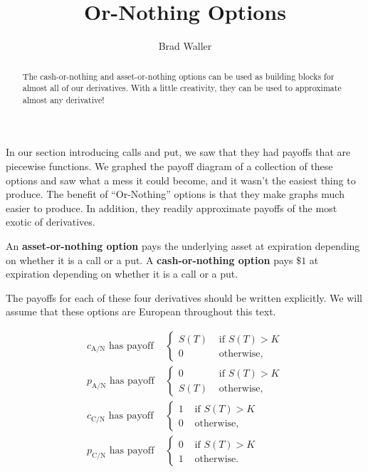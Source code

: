 \documentclass{ximera}
\author{Brad Waller}
\title{Or-Nothing Options}
\begin{document}
\begin{abstract}
The cash-or-nothing and asset-or-nothing options can be used as building blocks for almost all of our derivatives. With a little creativity, they can be used to approximate almost any derivative!
\end{abstract}

\maketitle

In our section introducing calls and put, we saw that they had payoffs that are piecewise functions. We graphed the payoff diagram of a collection of these options and saw what a mess it could become, and it wasn't the easiest thing to produce. The benefit of ``Or-Nothing'' options is that they make graphs much easier to produce. In addition, they readily approximate payoffs of the most exotic of derivatives. 

\begin{definition}
An {\bf asset-or-nothing option} pays the underlying asset at expiration depending on whether it is a call or a put. A {\bf cash-or-nothing option} pays $\$1$ at expiration depending on whether it is a call or a put. 
\end{definition}

The payoffs for each of these four derivatives should be written explicitly. We will assume that these options are European throughout this text.

\begin{align*}
c_{\text{A/N}}\text{ has payoff }&
	\begin{cases}
	S(T)	&\text{ if } S(T)>K\\
	0	&\text{ otherwise,}
	\end{cases}\\
p_{\text{A/N}}\text{ has payoff } &
	\begin{cases}
	0	&\text{ if } S(T)>K\\
	S(T)	&\text{ otherwise,}
	\end{cases}\\
c_{\text{C/N}}\text{ has payoff } &
	\begin{cases}
	1	&\text{ if } S(T)>K\\
	0	&\text{ otherwise,}
	\end{cases}\\
p_{\text{C/N}}\text{ has payoff } &
	\begin{cases}
	0	&\text{ if } S(T)>K\\
	1	&\text{ otherwise.}
	\end{cases}
\end{align*}
\end{document}
